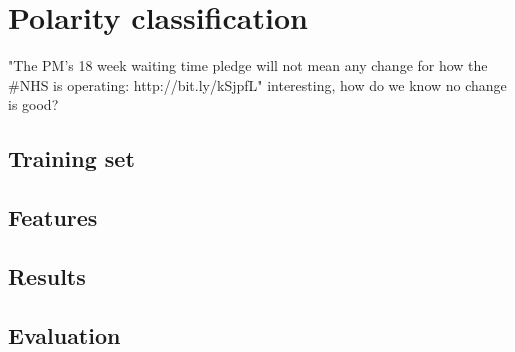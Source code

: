 \chapter{Polarity classification}
\label{polarity}

"The PM's 18 week waiting time pledge will not mean any change for how the \#NHS is operating: http://bit.ly/kSjpfL" interesting, how do we know no change is good?

\section{Training set}

\section{Features}

\section{Results}

\section{Evaluation}


